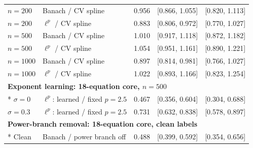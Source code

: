 \begin{table}[!htbp]
\begin{tabular}{llrrr}
$n=200$ & Banach / CV spline & 0.956 & [0.866, 1.055] & [0.820, 1.113] \\
$n=200$ & $\ell^p$ / CV spline & 0.883 & [0.806, 0.972] & [0.770, 1.027] \\
$n=500$ & Banach / CV spline & 1.010 & [0.917, 1.118] & [0.872, 1.182] \\
$n=500$ & $\ell^p$ / CV spline & 1.054 & [0.951, 1.161] & [0.890, 1.221] \\
$n=1000$ & Banach / CV spline & 0.897 & [0.814, 0.981] & [0.766, 1.027] \\
$n=1000$ & $\ell^p$ / CV spline & 1.022 & [0.893, 1.166] & [0.823, 1.254] \\
\multicolumn{5}{l}{\textbf{Exponent learning: 18-equation core, $n=500$}}\\*
$\sigma=0$ & $\ell^p$: learned / fixed $p=2.5$ & 0.467 & [0.356, 0.604] & [0.304, 0.688] \\
$\sigma=0.3$ & $\ell^p$: learned / fixed $p=2.5$ & 0.731 & [0.632, 0.838] & [0.578, 0.897] \\
\multicolumn{5}{l}{\textbf{Power-branch removal: 18-equation core, clean labels}}\\*
Clean & Banach / power branch off & 0.488 & [0.399, 0.592] & [0.354, 0.656] \\
\bottomrule\end{tabular}\end{table}
